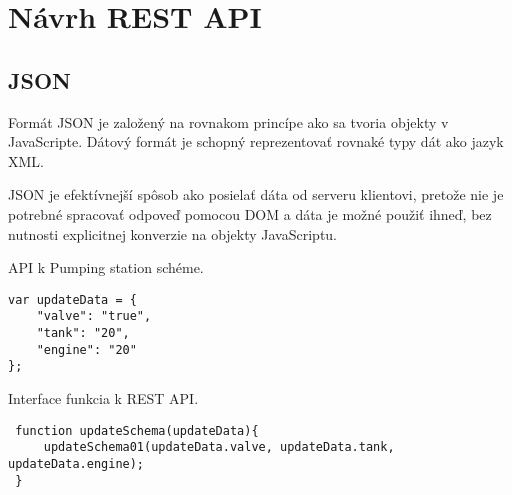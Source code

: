 \chapter{Návrh \acs{REST} \acs{API}}



\section{\acs{JSON}}



Formát \ac{JSON} je založený na rovnakom princípe ako sa tvoria objekty v JavaScripte. Dátový formát je schopný reprezentovať rovnaké typy dát ako jazyk \acs{XML}. \cite[p.~622-4]{Zakas}

JSON je efektívnejší spôsob ako posielať dáta od serveru klientovi, pretože nie je potrebné spracovať odpoveď pomocou \acs{DOM} a dáta je možné použiť ihneď, bez nutnosti explicitnej konverzie na objekty JavaScriptu. \cite[p.~280]{Suehring}











%
%



API k Pumping station schéme. 

\begin{lstlisting}
var updateData = {
	"valve": "true",
	"tank": "20",
	"engine": "20"
};
\end{lstlisting}





 Interface funkcia k REST API. 
 
 \begin{lstlisting}
 function updateSchema(updateData){
	 updateSchema01(updateData.valve, updateData.tank, updateData.engine);
 }
 \end{lstlisting}
